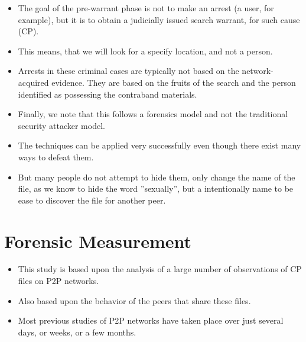 \documentclass[notes]{beamer}
\begin{document}
\begin{frame}

\begin{itemize}

\item[\checkmark]The goal of the pre-warrant phase is not to make an arrest (a user, for example), but it is to obtain a judicially issued search warrant, for such cause (CP).

\item[\checkmark]This means, that we will look for a specify location, and not a person.

\item[\checkmark]Arrests in these criminal cases are typically not based on the network-acquired evidence. They are based on the fruits of the search and the person identified as possessing the contraband materials.

\end{itemize}

\end{frame}

\begin{frame}

\begin{itemize}

\item[\checkmark]Finally, we note that this follows a forensics model and
not the traditional security attacker model.

\item[\checkmark]The techniques can be applied very successfully even though there exist many ways to defeat them.

\item[\checkmark]But many people do not attempt to hide them, only change the name of the file, as we know to hide the word ''sexually'', but a intentionally name to be ease to discover the file for another peer.

\end{itemize}

\end{frame}

\section{Forensic Measurement}
\begin{frame}

\begin{itemize}

\item[\checkmark] This study is based upon the analysis of a large number of observations of CP files on P2P networks.

\item[\checkmark] Also based upon the behavior of the peers that share these files.

\item[\checkmark] Most previous studies of P2P networks have taken place over just several days, or weeks, or a few months.

\end{itemize}

\end{frame}
\end{document}
